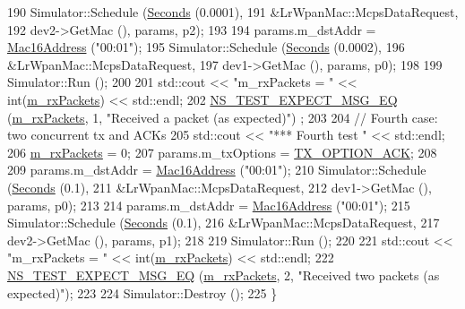 \begin{DoxyCode}
190   Simulator::Schedule (\hyperlink{group__timecivil_ga33c34b816f8ff6628e33d5c8e9713b9e}{Seconds} (0.0001),
191                        &LrWpanMac::McpsDataRequest,
192                        dev2->GetMac (), params, p2);
193 
194   params.m\_dstAddr = \hyperlink{classns3_1_1Mac16Address}{Mac16Address} (\textcolor{stringliteral}{"00:01"});
195   Simulator::Schedule (\hyperlink{group__timecivil_ga33c34b816f8ff6628e33d5c8e9713b9e}{Seconds} (0.0002),
196                        &LrWpanMac::McpsDataRequest,
197                        dev1->GetMac (), params, p0);
198 
199   Simulator::Run ();
200 
201   std::cout << \textcolor{stringliteral}{"m\_rxPackets = "} << int(\hyperlink{classLrWpanCollisionTestCase_a99c5c25759f67c884349444a74a86186}{m\_rxPackets}) << std::endl;
202   \hyperlink{group__testing_ga7304ba46a28d8cf08dfdfd6499cf7068}{NS\_TEST\_EXPECT\_MSG\_EQ} (\hyperlink{classLrWpanCollisionTestCase_a99c5c25759f67c884349444a74a86186}{m\_rxPackets}, 1, \textcolor{stringliteral}{"Received a packet (as expected)"})
      ;
203 
204   \textcolor{comment}{// Fourth case: two concurrent tx and ACKs}
205   std::cout << \textcolor{stringliteral}{"*** Fourth test "} << std::endl;
206   \hyperlink{classLrWpanCollisionTestCase_a99c5c25759f67c884349444a74a86186}{m\_rxPackets} = 0;
207   params.m\_txOptions = \hyperlink{group__lr-wpan_gga74ea891230ebf45d80d69a67266930a4a270a37d12b62bb8b5e92d646456244cf}{TX\_OPTION\_ACK};
208 
209   params.m\_dstAddr = \hyperlink{classns3_1_1Mac16Address}{Mac16Address} (\textcolor{stringliteral}{"00:01"});
210   Simulator::Schedule (\hyperlink{group__timecivil_ga33c34b816f8ff6628e33d5c8e9713b9e}{Seconds} (0.1),
211                        &LrWpanMac::McpsDataRequest,
212                        dev1->GetMac (), params, p0);
213 
214   params.m\_dstAddr = \hyperlink{classns3_1_1Mac16Address}{Mac16Address} (\textcolor{stringliteral}{"00:01"});
215   Simulator::Schedule (\hyperlink{group__timecivil_ga33c34b816f8ff6628e33d5c8e9713b9e}{Seconds} (0.1),
216                        &LrWpanMac::McpsDataRequest,
217                        dev2->GetMac (), params, p1);
218 
219   Simulator::Run ();
220 
221   std::cout << \textcolor{stringliteral}{"m\_rxPackets = "} << int(\hyperlink{classLrWpanCollisionTestCase_a99c5c25759f67c884349444a74a86186}{m\_rxPackets}) << std::endl;
222   \hyperlink{group__testing_ga7304ba46a28d8cf08dfdfd6499cf7068}{NS\_TEST\_EXPECT\_MSG\_EQ} (\hyperlink{classLrWpanCollisionTestCase_a99c5c25759f67c884349444a74a86186}{m\_rxPackets}, 2, \textcolor{stringliteral}{"Received two packets (as
       expected)"});
223 
224   Simulator::Destroy ();
225 \}
\end{DoxyCode}


